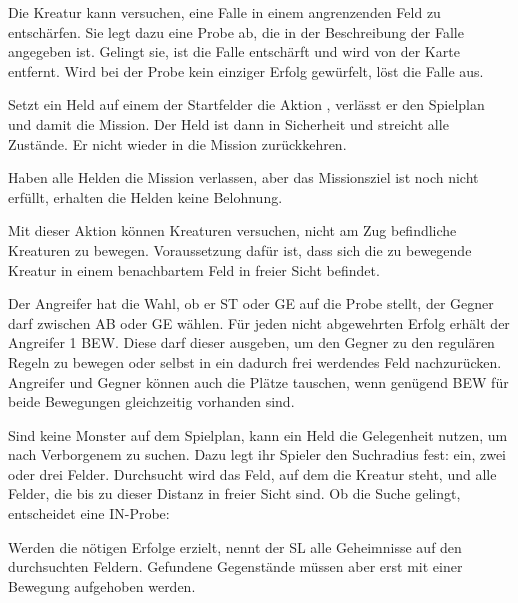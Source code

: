 {		
			Die Kreatur kann versuchen, eine Falle in einem angrenzenden Feld zu entschärfen. Sie legt dazu eine Probe ab, die in der Beschreibung der Falle angegeben ist. Gelingt sie, ist die Falle entschärft und wird von der Karte entfernt. Wird bei der Probe kein einziger Erfolg gewürfelt, löst die Falle aus.

			Setzt ein Held auf einem der Startfelder die Aktion , verlässt er den Spielplan und damit die Mission. Der Held ist dann in Sicherheit und streicht alle Zustände. Er nicht wieder in die Mission zurückkehren.

			Haben alle Helden die Mission verlassen, aber das Missionsziel ist noch nicht erfüllt, erhalten die Helden keine Belohnung.

			Mit dieser Aktion können Kreaturen versuchen, nicht am Zug befindliche Kreaturen zu bewegen. Voraussetzung dafür ist, dass sich die zu bewegende Kreatur in einem benachbartem Feld in freier Sicht befindet.

			Der Angreifer hat die Wahl, ob er ST oder GE auf die Probe stellt, der Gegner darf zwischen AB oder GE wählen. Für jeden nicht abgewehrten Erfolg erhält der Angreifer 1 BEW. Diese darf dieser ausgeben, um den Gegner zu den regulären Regeln zu bewegen oder selbst in ein dadurch frei werdendes Feld nachzurücken. Angreifer und Gegner können auch die Plätze tauschen, wenn genügend BEW für beide Bewegungen gleichzeitig vorhanden sind.

			Sind keine Monster auf dem Spielplan, kann ein Held die Gelegenheit nutzen, um nach Verborgenem zu suchen. Dazu legt ihr Spieler den Suchradius fest: ein, zwei oder drei Felder. Durchsucht wird das Feld, auf dem die Kreatur steht, und alle Felder, die bis zu dieser Distanz in freier Sicht sind. Ob die Suche gelingt, entscheidet eine IN-Probe:


			\noindent
			Werden die nötigen Erfolge erzielt, nennt der SL alle Geheimnisse auf den durchsuchten Feldern. Gefundene Gegenstände müssen aber erst mit einer Bewegung aufgehoben werden.

}
